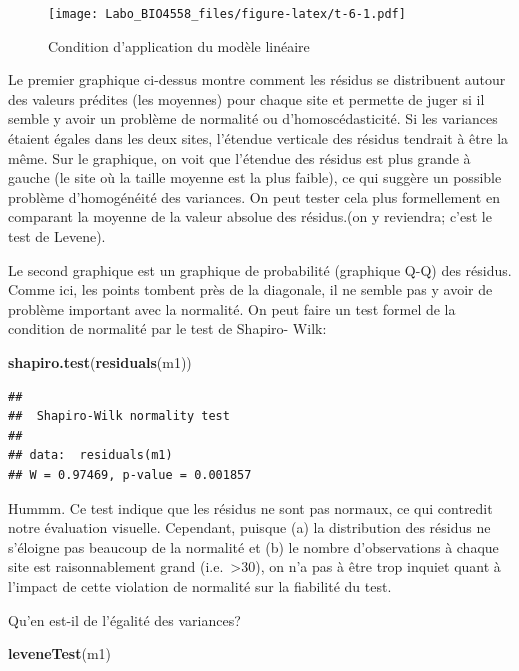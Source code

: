 \documentclass[12pt,]{book}
\newenvironment{Shaded}{\begin{snugshade}}{\end{snugshade}}
\newcommand{\KeywordTok}[1]{\textcolor[rgb]{0.27,0.27,0.27}{\textbf{#1}}}
\newcommand{\NormalTok}[1]{#1}
\begin{document}
\begin{figure}
\centering
\texttt{[image: Labo\_BIO4558\_files/figure-latex/t-6-1.pdf]}
\caption{\label{fig:t-6}Condition d'application du modèle linéaire}
\end{figure}

Le premier graphique ci-dessus montre comment les résidus se distribuent autour des valeurs prédites (les moyennes) pour chaque site et permette de juger si il semble y avoir un problème de normalité ou d'homoscédasticité. Si les variances étaient égales dans les deux sites, l'étendue verticale des résidus tendrait à être la même. Sur le graphique, on voit que l'étendue des résidus est plus grande à gauche (le site où la taille moyenne est la plus faible), ce qui suggère un possible problème d'homogénéité des variances. On peut tester cela plus formellement en comparant la moyenne de la valeur absolue des résidus.(on y reviendra; c'est le test de Levene).

Le second graphique est un graphique de probabilité (graphique Q-Q) des résidus. Comme ici, les points tombent près de la diagonale, il ne semble pas y avoir de problème important avec la normalité. On peut faire un test formel de la condition de normalité par le test de Shapiro- Wilk:

\begin{Shaded}
\begin{Highlighting}[]
\KeywordTok{shapiro.test}\NormalTok{(}\KeywordTok{residuals}\NormalTok{(m1))}
\end{Highlighting}
\end{Shaded}

\begin{verbatim}
## 
## 	Shapiro-Wilk normality test
## 
## data:  residuals(m1)
## W = 0.97469, p-value = 0.001857
\end{verbatim}

Hummm. Ce test indique que les résidus ne sont pas normaux, ce qui contredit notre évaluation visuelle. Cependant, puisque (a) la distribution des résidus ne s'éloigne pas beaucoup de la normalité et (b) le nombre d'observations à chaque site est raisonnablement grand (i.e.~\textgreater{}30), on n'a pas à être trop inquiet quant à l'impact de cette violation de normalité sur la fiabilité du test.

Qu'en est-il de l'égalité des variances?

\begin{Shaded}
\begin{Highlighting}[]
 \KeywordTok{leveneTest}\NormalTok{(m1)}
\end{Highlighting}
\end{Shaded}
\end{document}
